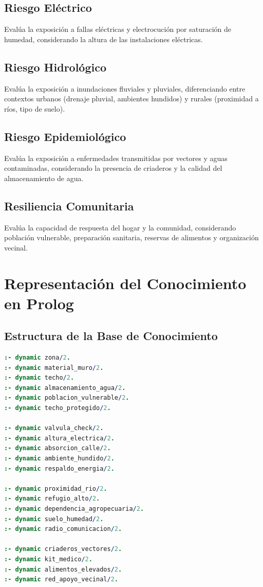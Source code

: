 \documentclass[12pt, letterpaper]{article}
\begin{document}
\subsection{Riesgo Eléctrico}
Evalúa la exposición a fallas eléctricas y electrocución por saturación de humedad, considerando la altura de las instalaciones eléctricas.

\subsection{Riesgo Hidrológico}
Evalúa la exposición a inundaciones fluviales y pluviales, diferenciando entre contextos urbanos (drenaje pluvial, ambientes hundidos) y rurales (proximidad a ríos, tipo de suelo).

\subsection{Riesgo Epidemiológico}
Evalúa la exposición a enfermedades transmitidas por vectores y aguas contaminadas, considerando la presencia de criaderos y la calidad del almacenamiento de agua.

\subsection{Resiliencia Comunitaria}
Evalúa la capacidad de respuesta del hogar y la comunidad, considerando población vulnerable, preparación sanitaria, reservas de alimentos y organización vecinal.

\section{Representación del Conocimiento en Prolog}

\subsection{Estructura de la Base de Conocimiento}

\begin{lstlisting}[language=Prolog, caption={Base de conocimiento dinámica en Prolog}]
:- dynamic zona/2.
:- dynamic material_muro/2.
:- dynamic techo/2.
:- dynamic almacenamiento_agua/2.
:- dynamic poblacion_vulnerable/2.
:- dynamic techo_protegido/2.

:- dynamic valvula_check/2.
:- dynamic altura_electrica/2.
:- dynamic absorcion_calle/2.
:- dynamic ambiente_hundido/2.
:- dynamic respaldo_energia/2.

:- dynamic proximidad_rio/2.
:- dynamic refugio_alto/2.
:- dynamic dependencia_agropecuaria/2.
:- dynamic suelo_humedad/2.
:- dynamic radio_comunicacion/2.

:- dynamic criaderos_vectores/2.
:- dynamic kit_medico/2.
:- dynamic alimentos_elevados/2.
:- dynamic red_apoyo_vecinal/2.
\end{lstlisting}
\end{document}
